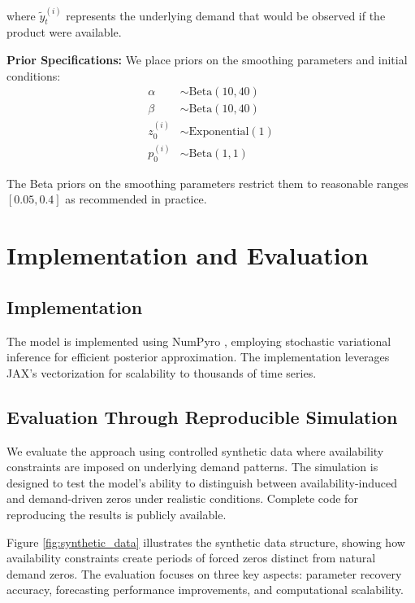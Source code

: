 \documentclass[11pt]{amsart}
\theoremstyle{definition}
\begin{document}
where $\tilde{y}_t^{(i)}$ represents the underlying demand that would be observed if the product were available.

\textbf{Prior Specifications:} We place priors on the smoothing parameters and initial conditions:
\begin{align}
\alpha &\sim \text{Beta}(10, 40) \label{eq:prior_alpha_correct} \\
\beta &\sim \text{Beta}(10, 40) \label{eq:prior_beta_correct} \\
z_0^{(i)} &\sim \text{Exponential}(1) \label{eq:prior_z0} \\
p_0^{(i)} &\sim \text{Beta}(1, 1) \label{eq:prior_p0}
\end{align}

The Beta priors on the smoothing parameters restrict them to reasonable ranges $[0.05, 0.4]$ as recommended in practice.

\section{Implementation and Evaluation}

\subsection{Implementation}

The model is implemented using NumPyro \cite{phan2019composable}, employing stochastic variational inference for efficient 
posterior approximation. The implementation leverages JAX's vectorization for scalability to thousands of time series.

\subsection{Evaluation Through Reproducible Simulation}

We evaluate the approach using controlled synthetic data where availability constraints are imposed on underlying demand 
patterns. The simulation is designed to test the model's ability to distinguish between availability-induced and 
demand-driven zeros under realistic conditions. Complete code for reproducing the results is publicly available.

Figure \ref{fig:synthetic_data} illustrates the synthetic data structure, showing how availability constraints create 
periods of forced zeros distinct from natural demand zeros. The evaluation focuses on three key aspects: parameter 
recovery accuracy, forecasting performance improvements, and computational scalability.
\end{document}
